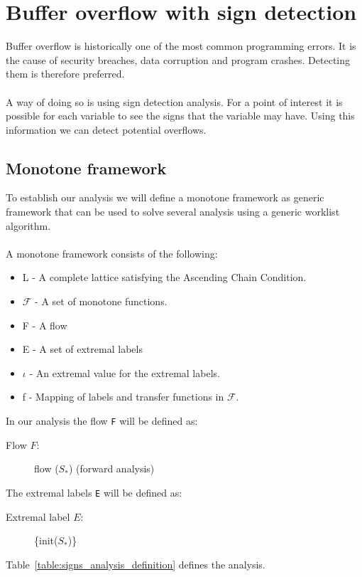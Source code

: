 \chapter{Buffer overflow with sign detection} \label{sec:exercise3}
Buffer overflow is historically one of the most common programming errors. It is the cause of security breaches, data corruption and program crashes. Detecting them is therefore preferred.
\\\\
A way of doing so is using sign detection analysis. For a point of interest it is possible for each variable to see the signs that the variable may have. Using this information we can detect potential overflows.

\section{Monotone framework}
To establish our analysis we will define a monotone framework as generic framework that can be used to solve several analysis using a generic worklist algorithm.
\\\\
A monotone framework consists of the following:
\begin{itemize}
	\item L - A complete lattice satisfying the Ascending Chain Condition.
	\item $\mathcal{F}$ - A set of monotone functions.
	\item F - A flow
	\item E - A set of extremal labels
	\item $\iota$ - An extremal value for the extremal labels.
	\item f - Mapping of labels and transfer functions in $\mathcal{F}$.
\end{itemize}
In our analysis the flow \texttt{F} will be defined as:
\begin{description}
  \item[Flow $F$:] flow ($S_*$) (forward analysis)
\end{description}
The extremal labels \texttt{E} will be defined as:
\begin{description}
    \item[Extremal label $E$:] \{init($S_*$)\}
\end{description}
\noindent Table~\ref{table:signs_analysis_definition} defines the analysis.
